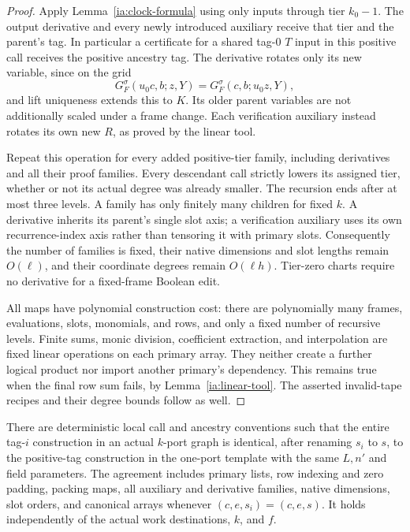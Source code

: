 \begin{proof}
Apply Lemma~\ref{ia:clock-formula} using only inputs through tier
$k_0-1$.  The output derivative and every newly introduced auxiliary
receive that tier and the parent's tag.  In particular a certificate
for a shared tag-$0$ $T$ input in this positive call receives the
positive ancestry tag.  The derivative rotates only its new variable,
since on the grid
\[
 G_F^\sigma(u_0c,b;z,Y)=G_F^\sigma(c,b;u_0z,Y),
\]
and lift uniqueness extends this to $K$.  Its older parent variables
are not additionally scaled under a frame change.  Each verification
auxiliary instead rotates its own new $R$, as proved by the linear
tool.

Repeat this operation for every added positive-tier family, including
derivatives and all their proof families.  Every descendant call
strictly lowers its assigned tier, whether or not its actual degree
was already smaller.  The recursion ends after at most three levels.
A family has only finitely many children for fixed $k$.  A derivative
inherits its parent's single slot axis; a verification auxiliary uses
its own recurrence-index axis rather than tensoring it with primary
slots.  Consequently the number of families is fixed, their native
dimensions and slot lengths remain $O(\ell)$, and their coordinate
degrees remain $O(\ell h)$.  Tier-zero charts require no derivative
for a fixed-frame Boolean edit.

All maps have polynomial construction cost: there are polynomially
many frames, evaluations, slots, monomials, and rows, and only a
fixed number of recursive levels.  Finite sums, monic division,
coefficient extraction, and interpolation are fixed linear operations
on each primary array.  They neither create a further logical product
nor import another primary's dependency.  This remains true when the
final row sum fails, by Lemma~\ref{ia:linear-tool}.  The asserted
invalid-tape recipes and their degree bounds follow as well.
\end{proof}

\begin{lemma}\label{ia:port-ancestry}
There are deterministic local call and ancestry conventions such that
the entire tag-$i$ construction in an actual $k$-port graph is
identical, after renaming $s_i$ to $s$, to the positive-tag construction
in the one-port template with the same $L,n'$ and field parameters.
The agreement includes primary lists, row indexing and zero padding,
packing maps, all auxiliary and derivative families, native dimensions,
slot orders, and canonical arrays whenever $(c,e,s_i)=(c,e,s)$.
It holds independently of the actual work destinations, $k$, and $f$.
\end{lemma}

